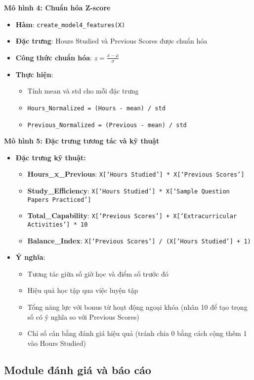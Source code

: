 \textbf{Mô hình 4: Chuẩn hóa Z-score}
\begin{itemize}
	\item \textbf{Hàm}: \texttt{create\_model4\_features(X)}
	\item \textbf{Đặc trưng}: Hours Studied và Previous Scores được chuẩn hóa
	\item \textbf{Công thức chuẩn hóa}: \(z = \frac{x - \mu}{\sigma}\)
	\item \textbf{Thực hiện}:
	      \begin{itemize}
		      \item Tính mean và std cho mỗi đặc trưng
		      \item \texttt{Hours\_Normalized = (Hours - mean) / std}
		      \item \texttt{Previous\_Normalized = (Previous - mean) / std}
	      \end{itemize}
\end{itemize}

\textbf{Mô hình 5: Đặc trưng tương tác và kỹ thuật}
\begin{itemize}
	\item \textbf{Đặc trưng kỹ thuật:}
	\begin{itemize}
		\item \textbf{Hours\_x\_Previous}: \texttt{X[`Hours Studied'] * X[`Previous Scores']}
		\item \textbf{Study\_Efficiency}: \texttt{X[`Hours Studied'] * X[`Sample Question Papers Practiced']}
		\item \textbf{Total\_Capability}: \texttt{X[`Previous Scores'] + X[`Extracurricular Activities'] * 10}
		\item \textbf{Balance\_Index}: \texttt{X[`Previous Scores'] / (X[`Hours Studied'] + 1)}
	\end{itemize}
	\item \textbf{Ý nghĩa}:
	\begin{itemize}
		\item Tương tác giữa số giờ học và điểm số trước đó
		\item Hiệu quả học tập qua việc luyện tập
		\item Tổng năng lực với bonus từ hoạt động ngoại khóa (nhân 10 để tạo trọng số có ý nghĩa so với Previous Scores)
		\item Chỉ số cân bằng đánh giá hiệu quả (tránh chia 0 bằng cách cộng thêm 1 vào Hours Studied)
	\end{itemize}
\end{itemize}

\subsection{Module đánh giá và báo cáo}

